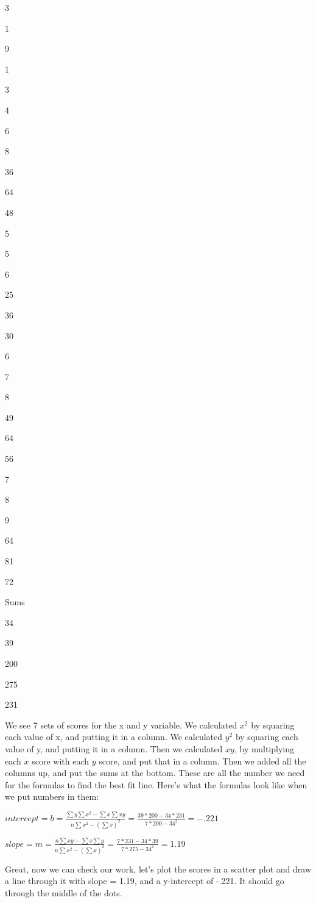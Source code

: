 \documentclass[]{book}
\begin{document}
3

1

9

1

3

4

6

8

36

64

48

5

5

6

25

36

30

6

7

8

49

64

56

7

8

9

64

81

72

Sums

34

39

200

275

231

We see 7 sets of scores for the x and y variable. We calculated \(x^2\) by squaring each value of x, and putting it in a column. We calculated \(y^2\) by squaring each value of y, and putting it in a column. Then we calculated \(xy\), by multiplying each \(x\) score with each \(y\) score, and put that in a column. Then we added all the columns up, and put the sums at the bottom. These are all the number we need for the formulas to find the best fit line. Here's what the formulas look like when we put numbers in them:

\(intercept = b = \frac{\sum{y}\sum{x^2}-\sum{x}\sum{xy}}{n\sum{x^2}-(\sum{x})^2} = \frac{39 * 200 - 34*231}{7*200-34^2} = -.221\)

\(slope = m = \frac{n\sum{xy}-\sum{x}\sum{y}}{n\sum{x^2}-(\sum{x})^2} = \frac{7*231-34*39}{7*275-34^2} = 1.19\)

Great, now we can check our work, let's plot the scores in a scatter plot and draw a line through it with slope = 1.19, and a y-intercept of -.221. It should go through the middle of the dots.
\end{document}
